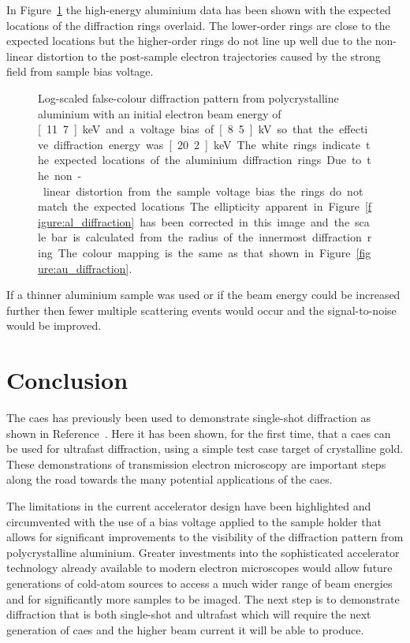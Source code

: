 In Figure~\ref{figure:al_diffraction_rings} the high-energy aluminium data has been shown with the expected locations of the diffraction rings overlaid.
The lower-order rings are close to the expected locations but the higher-order rings do not line up well due to the non-linear distortion to the post-sample electron trajectories caused by the strong field from sample bias voltage.

\begin{figure}
    \center
    
    \caption[Diffraction pattern from aluminium demonstrating the distortion from the voltage bias.]{Log-scaled false-colour diffraction pattern from polycrystalline aluminium with an initial electron beam energy of \unit[11.7]{keV} and a voltage bias of \unit[8.5]{kV} so that the effective diffraction energy was \unit[20.2]{keV}. The white rings indicate the expected locations of the aluminium diffraction rings. Due to the non-linear distortion from the sample voltage bias the rings do not match the expected locations. The ellipticity apparent in Figure~\ref{figure:al_diffraction} has been corrected in this image and the scale bar is calculated from the radius of the innermost diffraction ring. The colour mapping is the same as that shown in Figure~\ref{figure:au_diffraction}.}
    \label{figure:al_diffraction_rings}
\end{figure}

If a thinner aluminium sample was used or if the beam energy could be increased further then fewer multiple scattering events would occur and the signal-to-noise would be improved.

\section{Conclusion}

The \gls{caes} has previously been used to demonstrate single-shot diffraction as shown in Reference~\cite{speirs_single-shot_2015}.
Here it has been shown, for the first time, that a \gls{caes} can be used for ultrafast diffraction, using a simple test case target of crystalline gold.
These demonstrations of transmission electron microscopy are important steps along the road towards the many potential applications of the \gls{caes}.

The limitations in the current accelerator design have been highlighted and circumvented with the use of a bias voltage applied to the sample holder that allows for significant improvements to the visibility of the diffraction pattern from polycrystalline aluminium.
Greater investments into the sophisticated accelerator technology already available to modern electron microscopes would allow future generations of cold-atom sources to access a much wider range of beam energies and for significantly more samples to be imaged.
The next step is to demonstrate diffraction that is both single-shot and ultrafast which will require the next generation of \gls{caes} and the higher beam current it will be able to produce.

